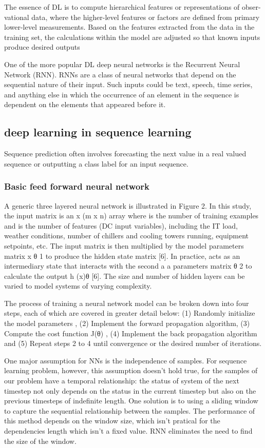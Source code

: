 \documentclass[5p]{elsarticle}
\begin{document}
The essence of DL is to compute hierarchical features or representations of obser-vational data, where the higher-level features or factors are defined from primary lower-level measurements. Based on the features extracted from the data in the training set, the calculations within the model are adjusted so that known inputs produce desired outputs

One of the more popular DL deep neural networks is the Recurrent Neural Network (RNN). RNNs are a class of neural networks that depend on the sequential nature of their input. Such inputs could be text, speech, time series, and anything else in which the occurrence of an element in the sequence is dependent on the elements that appeared before it.

\subsection{deep learning in sequence learning}
Sequence prediction often involves forecasting the next value in a real valued sequence or outputting a class label for an input sequence.
\subsubsection{Basic feed forward neural network}
A generic three layered neural network is illustrated in Figure 2. In this study, the input matrix is an x (m x n) array where is the number of training examples and is the number of features (DC input variables), including the IT load, weather conditions, number of chillers and cooling towers running, equipment setpoints, etc. The input matrix is then multiplied by the model parameters matrix x θ 1 to produce the hidden state matrix [6]. In practice, acts as an intermediary state that interacts with the second a a parameters matrix θ 2 to calculate the output h (x)θ [6]. The size and number of hidden layers can be varied to model systems of varying complexity.

The process of training a neural network model can be broken down into four steps, each of which are covered in greater detail below: (1) Randomly initialize the model parameters , (2) Implement the forward propagation algorithm, (3) Compute the cost function J(θ) , (4) Implement the back propagation algorithm and (5) Repeat steps 2 to 4 until convergence or the desired number of iterations.

One major assumption for NNs is the independence of samples. For sequence learning problem, however, this assumption doesn't hold true, for the samples of our problem have a temporal relationship: the status of system of the next timestep not only depends on the status in the current timestep but also on the previous timesteps of indefinite length. One solution is to using a sliding window to capture the sequential relationship between the samples. The performance of this method depends on the window size, which isn't pratical for the dependencies length which isn't a fixed value. RNN eliminates the need to find the size of the window.
\end{document}
